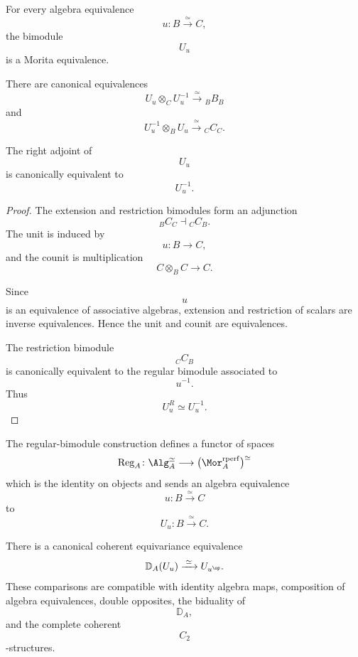 \begin{lemma}
\label{lem:regular-algebra-equivalence-morita}
For every algebra equivalence
\[
    u
    \colon
    B
    \xrightarrow{\;\simeq\;}
    C,
\]
the bimodule
\[
    U_u
\]
is a Morita equivalence.

There are canonical equivalences
\[
    U_u\otimes_CU_u^{-1}
    \xrightarrow{\;\simeq\;}
    {}_B B_B
\]
and
\[
    U_u^{-1}\otimes_BU_u
    \xrightarrow{\;\simeq\;}
    {}_C C_C.
\]

The right adjoint of
\[
    U_u
\]
is canonically equivalent to
\[
    U_u^{-1}.
\]
\end{lemma}

\begin{proof}
The extension and restriction bimodules form an adjunction
\[
    {}_B C_C
    \dashv
    {}_C C_B.
\]
The unit is induced by
\[
    u
    \colon
    B
    \longrightarrow
    C,
\]
and the counit is multiplication
\[
    C\otimes_BC
    \longrightarrow
    C.
\]

Since
\[
    u
\]
is an equivalence of associative algebras, extension and restriction of
scalars are inverse equivalences. Hence the unit and counit are
equivalences.

The restriction bimodule
\[
    {}_C C_B
\]
is canonically equivalent to the regular bimodule associated to
\[
    u^{-1}.
\]
Thus
\[
    U_u^R
    \simeq
    U_u^{-1}.
\]
\end{proof}

\begin{proposition}
\label{prop:regular-morita-equivariance}
The regular-bimodule construction defines a functor of spaces
\[
    \operatorname{Reg}_A
    \colon
    \Alg_A^\simeq
    \longrightarrow
    \bigl(
        \Mor_A^{\mathrm{rperf}}
    \bigr)^\simeq
\]
which is the identity on objects and sends an algebra equivalence
\[
    u
    \colon
    B
    \xrightarrow{\;\simeq\;}
    C
\]
to
\[
    U_u
    \colon
    B
    \xrightarrow{\;\simeq\;}
    C.
\]

There is a canonical coherent equivariance equivalence
\[
    \mathbb D_A(U_u)
    \xrightarrow{\;\simeq\;}
    U_{u^{\op}}.
\]
These comparisons are compatible with identity algebra maps,
composition of algebra equivalences, double opposites, the biduality of
\[
    \mathbb D_A,
\]
and the complete coherent
\[
    C_2
\]
-structures.
\end{proposition}

